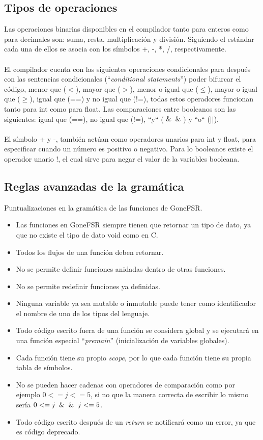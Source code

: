\subsection{Tipos de operaciones}
Las operaciones binarias disponibles en el compilador tanto para enteros como para decimales son: suma, resta, multiplicación y división. Siguiendo el estándar cada una de ellos se asocia con los símbolos +, -, *, /, respectivamente.\\\\
El compilador cuenta con las siguientes operaciones condicionales para después con las sentencias condicionales (``\textit{conditional statements}'') poder  bifurcar el código, menor que ($<$), mayor que ($>$), menor o igual que ($\leq$), mayor o igual que ($\geq$), igual que (==) y no igual que (!=), todas estos operadores funcionan tanto para int como para float. Las comparaciones entre booleanos son las siguientes: igual que (==), no igual que (!=), ``y`` ($\And\And$) y ``o`` ($||$).\\\\
El símbolo + y -, también actúan como operadores unarios para int y float, para especificar cuando un número es positivo o negativo. Para lo booleanos existe el operador unario !, el cual sirve para negar el valor de la variables booleana. 
\subsection{Reglas avanzadas de la gramática}
\label{reglas gramaticales 2}
Puntualizaciones en la gramática de las funciones de GoneFSR. 
\begin{itemize}
    \item{Las funciones en GoneFSR siempre tienen que retornar un tipo de dato, ya que no existe el tipo de dato void como en C.}
    \item{Todos los flujos de una función deben retornar.}
    \item{No se permite definir funciones anidadas dentro de otras funciones.  }
    \item{No se permite redefinir funciones ya definidas.}
    \item{Ninguna variable ya sea mutable o inmutable puede tener como identificador el nombre de uno de los tipos del lenguaje.}
    \item{Todo código escrito fuera de una función se considera global y se ejecutará en una función especial ``\textit{premain}'' (inicialización de variables globales).}
    \item{Cada función tiene su propio \textit{scope}, por lo que cada función tiene su propia tabla de símbolos.}
    \item{No se pueden hacer cadenas con operadores de comparación como por ejemplo $0<=j<=5$, si no que la manera correcta de escribir lo mismo sería $0<=j \And\And j<=5$.}
    \item{Todo código escrito después de un \textit{return} se notificará como un error, ya que es código deprecado.}\\
\end{itemize}


